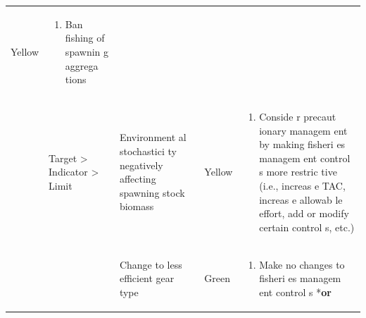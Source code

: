 \documentclass[]{book}
\providecommand{\tightlist}{%
  \setlength{\itemsep}{0pt}\setlength{\parskip}{0pt}}
\begin{document}
\begin{longtable}[]{@{}lllll@{}}
\begin{minipage}[t]{0.19\columnwidth}
Yellow\strut
\end{minipage} & \begin{minipage}[t]{0.19\columnwidth}\raggedright\strut
\begin{enumerate}
\def\labelenumi{\arabic{enumi}.}
\tightlist
\item
  Ban fishing of spawnin g aggrega tions
\end{enumerate}\strut
\end{minipage}\tabularnewline
\begin{minipage}[t]{0.19\columnwidth}\raggedright\strut
\strut
\end{minipage} & \begin{minipage}[t]{0.19\columnwidth}\raggedright\strut
Target \textgreater{} Indicator \textgreater{} Limit\strut
\end{minipage} & \begin{minipage}[t]{0.19\columnwidth}\raggedright\strut
Environment al stochastici ty negatively affecting spawning stock
biomass\strut
\end{minipage} & \begin{minipage}[t]{0.19\columnwidth}\raggedright\strut
Yellow\strut
\end{minipage} & \begin{minipage}[t]{0.19\columnwidth}\raggedright\strut
\begin{enumerate}
\def\labelenumi{\arabic{enumi}.}
\tightlist
\item
  Conside r precaut ionary managem ent by making fisheri es managem ent
  control s more restric tive (i.e., increas e TAC, increas e allowab le
  effort, add or modify certain control s, etc.)
\end{enumerate}\strut
\end{minipage}\tabularnewline
\begin{minipage}[t]{0.19\columnwidth}\raggedright\strut
\strut
\end{minipage} & \begin{minipage}[t]{0.19\columnwidth}\raggedright\strut
\strut
\end{minipage} & \begin{minipage}[t]{0.19\columnwidth}\raggedright\strut
Change to less efficient gear type\strut
\end{minipage} & \begin{minipage}[t]{0.19\columnwidth}\raggedright\strut
Green\strut
\end{minipage} & \begin{minipage}[t]{0.19\columnwidth}\raggedright\strut
\begin{enumerate}
\def\labelenumi{\arabic{enumi}.}
\tightlist
\item
  Make no changes to fisheri es managem ent control s *\textbf{or}
\end{enumerate}


\end{minipage}
\end{longtable}
\end{document}

